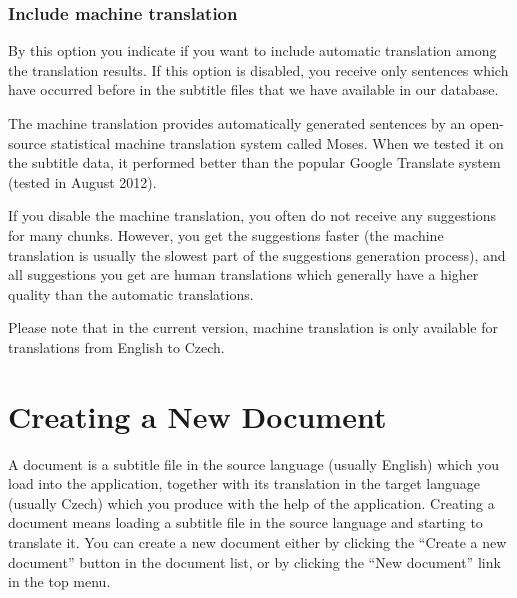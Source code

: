 \subsubsection{Include machine translation}

By this option you indicate if you want to include automatic translation among the translation results. If this option is disabled, you receive only sentences which have occurred before in the subtitle files that we have available in our database.

The machine translation provides automatically generated sentences by an open-source statistical machine translation system called Moses. When we tested it on the subtitle data, it performed better than the popular Google Translate system (tested in August 2012).

If you disable the machine translation, you often do not receive any suggestions for many chunks. However, you get the suggestions faster (the machine translation is usually the slowest part of the suggestions generation process), and all suggestions you get are human translations which generally have a higher quality than the automatic translations.

Please note that in the current version, machine translation is only available for translations from English to Czech.

\section{Creating a New Document}

A document is a subtitle file in the source language (usually English) which you load into the application, together with its translation in the target language (usually Czech) which you produce with the help of the application. Creating a document means loading a subtitle file in the source language and starting to translate it. You can create a new document either by clicking the ``Create a new document'' button in the document list, or by clicking the ``New document'' link in the top menu.

